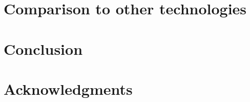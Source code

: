 \documentclass[preprint,12pt]{elsarticle}
\begin{document}
\section{Comparison to other technologies}
\label{comparison}


\section{Conclusion}
\label{conclusion}


\section{Acknowledgments}
\label{acknowledgments}



\end{document}
